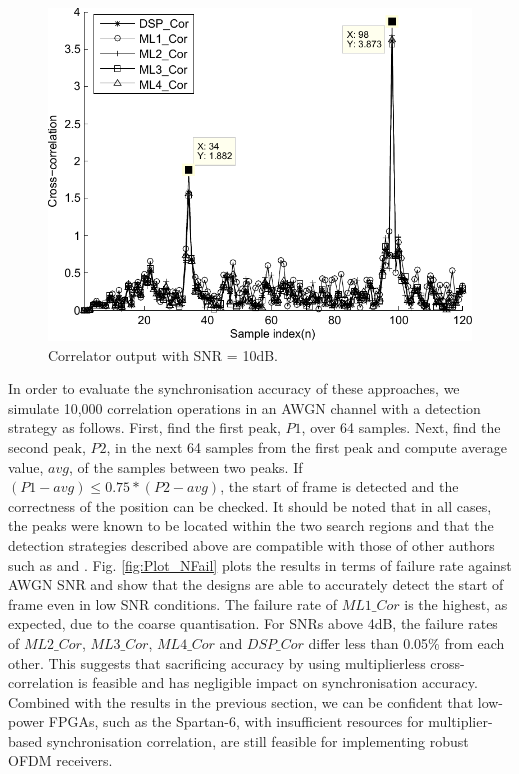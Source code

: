\begin{figure}
	\centerline{\includegraphics [width=0.9\columnwidth] {figures/Plot_XCR.pdf} }
	\caption{Correlator output with SNR = 10dB.}
	\label{fig:Plot_XCR}
\end{figure}

In order to evaluate the synchronisation accuracy of these approaches, we simulate 10,000 correlation operations in an AWGN channel with a detection strategy as follows. 
First, find the first peak, $P1$, over 64 samples. 
Next, find the second peak, $P2$, in the next 64 samples from the first peak and compute average value, $avg$, of the samples between two peaks. 
If  $( P1 - avg ) \le  0.75 * ( P2 - avg )$, the start of frame is detected and the correctness of the position can be checked. 
It should be noted that in all cases, the peaks were known to be located within the two search regions and that the detection strategies described above are compatible with those of other authors such as \cite{Kishore2006} and \cite{Yip2003}. 
Fig. \ref{fig:Plot_NFail} plots the results in terms of failure rate against AWGN SNR and show that the designs are able to accurately detect the start of frame even in low SNR conditions. 
The failure rate of $ML1\_Cor$ is the highest, as expected, due to the coarse quantisation.
For SNRs above 4{\thinspace}dB, the failure rates of $ML2\_Cor$, $ML3\_Cor$,  $ML4\_Cor$ and $DSP\_Cor$ differ less than 0.05\% from each other.
This suggests that sacrificing accuracy by using multiplierless cross-correlation is feasible and has negligible impact on synchronisation accuracy.
Combined with the results in the previous section, we can be confident that low-power FPGAs, such as the Spartan-6, with insufficient resources for multiplier-based synchronisation correlation, are still feasible for implementing robust OFDM receivers.

